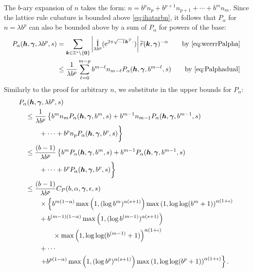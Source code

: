 \documentclass[authoryear]{elsarticle}
\newcommand{\tr}{\widetilde{r}}
\DeclareMathOperator{\appxint}{\hat{I}}
\begin{document}
The  $b$-ary expansion of $n$ takes the form:  $n = b^pn_p + b^{p+1}n_{p+1} + \cdots + b^m n_m$. 
Since the lattice rule cubature is bounded above \eqref{eq:ihatarbn}, it follows that $P_\alpha$ for $n = \lambda b^p$ can also be bounded above by a sum of $P_\alpha$ for powers of the base: 
\begin{align*}
    P_\alpha(\vh,\vgamma,\lambda b^p,s)
    & = \sum_{\vk \in \integers^s \setminus\{\vzero\}} \abs{\appxint_{\lambda b^p}(\me^{2 \pi \sqrt{-1} \vk^T \cdot})}\tr(\vk,\vgamma)^{-\alpha} \qquad \text{by \eqref{eq:wcerrPalpha}} \\
    & \le \frac {1}{\lambda b^p} \sum_{\ell = 0}^{m-p} b^{m-\ell} n_{m -\ell} P_\alpha(\vh,\vgamma,b^{m-\ell},s) \qquad \text{by \eqref{eq:Palphadual}}
\end{align*}
Similarly to the proof for arbitrary $n$, we substitute in the upper bounds for $P_\alpha$:  
\begin{align} \label{eq:sameargument1}
    \nonumber
    \MoveEqLeft[1]
   P_\alpha(\vh,\vgamma,\lambda b^p,s)  \\
    &\le \frac {1}{\lambda b^p} \left\{ b^m n_m P_\alpha(\vh,\vgamma,b^m,s) + b^{m-1} n_{m-1} P_\alpha(\vh,\vgamma,b^{m-1},s) \right. \\
     \nonumber
    &\qquad + \cdots + b^p n_p P_\alpha(\vh,\vgamma,b^p,s) 
    \bigg\} \\ 
     \nonumber
    & \le \frac {(b-1)}{\lambda b^p}  
    \left\{
    b^m  P_\alpha(\vh,\vgamma,b^m,s) + b^{m-1}  P_\alpha(\vh,\vgamma,b^{m-1},s) \right. \\
     \nonumber
    &\qquad + \cdots + b^p  P_\alpha(\vh,\vgamma,b^p,s) 
    \bigg\} \\
     \nonumber
    & \le \frac {(b-1)}{\lambda b^p} C_{P}(b,\alpha,\vgamma,\epsilon,s) \\
     \nonumber
    &\qquad \times \left\{ b^{m(1-\alpha)}\max\left(1, (\log b^m)^{\alpha(s+1)}\right) \max\left(1,\log \log (b^m+1)\right)^{\alpha(1+\epsilon)} \right.\\ 
     \nonumber
    & \qquad  + b^{(m-1)(1-\alpha)}\max\left(1, (\log b^{(m-1)})^{\alpha(s+1)}\right) \\
    & \nonumber \qquad \qquad \times \max\left(1,\log \log (b^{(m-1)}+1)\right)^{\alpha(1+\epsilon)}\\
     \nonumber
    &  \qquad + \cdots \\
    & \qquad  \left . +   b^{p(1-\alpha)}\max\left(1,(\log b^p)^{\alpha(s+1)}\right) \max\left(1,\log \log (b^p+1)\right)^{\alpha(1+\epsilon)}  \right\}.
\end{align}
\end{document}
